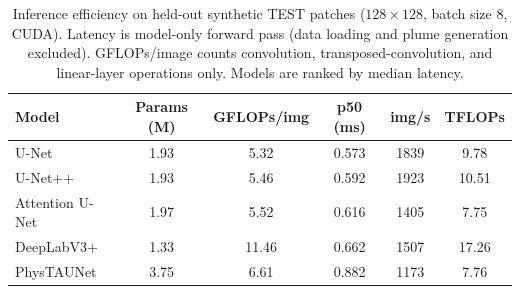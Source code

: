 \begin{table}[t]
\centering
\caption{Inference efficiency on held-out synthetic TEST patches ($128\times128$, batch size 8, CUDA). Latency is model-only forward pass (data loading and plume generation excluded). GFLOPs/image counts convolution, transposed-convolution, and linear-layer operations only. Models are ranked by median latency.}
\label{tab:efficiency}
\small
\begin{tabular}{lccccc}
\toprule
Model & Params (M) & GFLOPs/img & p50 (ms) & img/s & TFLOPs \\
\midrule
U-Net & 1.93 & 5.32 & 0.573 & 1839 & 9.78 \\
U-Net++ & 1.93 & 5.46 & 0.592 & 1923 & 10.51 \\
Attention U-Net & 1.97 & 5.52 & 0.616 & 1405 & 7.75 \\
DeepLabV3+ & 1.33 & 11.46 & 0.662 & 1507 & 17.26 \\
PhysTAUNet & 3.75 & 6.61 & 0.882 & 1173 & 7.76 \\
\bottomrule
\end{tabular}
\end{table}
